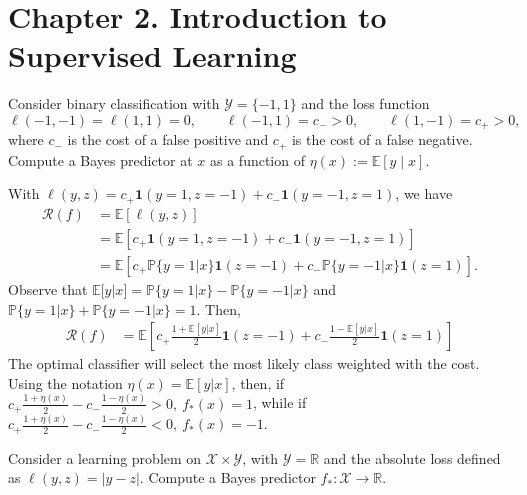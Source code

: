 \section*{Chapter 2. Introduction to Supervised Learning}

\begin{exercise}[2.1] 
Consider binary classification with $\mathcal{Y} = \{-1,1\}$ and the loss function
$$
\ell(-1,-1) = \ell(1,1) = 0, \qquad
\ell(-1,1) = c_- > 0, \qquad
\ell(1,-1) = c_+ > 0,
$$
where $c_-$ is the cost of a false positive and $c_+$ is the cost of a false negative. Compute a Bayes predictor at $x$ as a function of $\eta(x) := \mathbb{E}[y \mid x]$.
\end{exercise}

\begin{tcolorbox}[title=Solution]
With $\ell(y,z) = c_{+}\mathbf{1}(y=1,z=-1)+ c_{-}\mathbf{1}(y=-1, z=1)$, we have 
\begin{align*}
    \mathcal{R}(f) &= \mathbb{E}[\ell(y,z)] \\
    &= \mathbb{E}[c_{+}\mathbf{1}(y=1,z=-1) + c_{-}\mathbf{1}(y=-1, z=1)] \\
    &= \mathbb{E}[c_{+}\mathbb{P}\{y=1|x\}\mathbf{1}(z=-1) + c_{-}\mathbb{P}\{y=-1|x\}\mathbf{1}(z=1)].
\end{align*}
Observe that $\mathbb{E}[y|x] = \mathbb{P}\{y=1|x\} -\mathbb{P}\{y=-1|x\}$ and $\mathbb{P}\{y=1|x\} + \mathbb{P}\{y=-1|x\} = 1$. Then, 
\begin{align*}
    \mathcal{R}(f) &= \mathbb{E}[c_{+}\frac{1+\mathbb{E}[y|x]}{2}\mathbf{1}(z=-1) + c_{-}\frac{1-\mathbb{E}[y|x]}{2}\mathbf{1}(z=1)]
\end{align*}
The optimal classifier will select the most likely class weighted with the cost. Using the notation $\eta(x) = \mathbb{E}[y|x]$, then, if $c_{+}\frac{1+\eta(x)}{2} - c_{-}\frac{1-\eta(x)}{2}>0, \ f_*(x)=1$, while if $c_{+}\frac{1+\eta(x)}{2} - c_{-}\frac{1-\eta(x)}{2}<0, \ f_*(x)=-1$.
\end{tcolorbox}

\begin{exercise}[2.2]
Consider a learning problem on $\mathcal{X} \times \mathcal{Y}$, with $\mathcal{Y} = \mathbb{R}$ and the absolute loss defined as $\ell(y,z) = |y-z|$. Compute a Bayes predictor $f_* : \mathcal{X} \to \mathbb{R}$.
\end{exercise}

